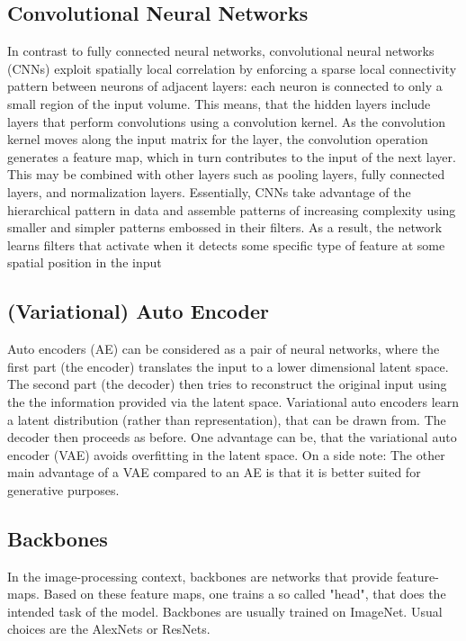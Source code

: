 \subsection{Convolutional Neural Networks}
In contrast to fully connected neural networks, convolutional neural networks (CNNs) exploit spatially local correlation by enforcing a sparse local connectivity pattern between neurons of adjacent layers: each neuron is connected to only a small region of the input volume.
This means, that the hidden layers include layers that perform convolutions using a convolution kernel. As the convolution kernel moves along the input matrix for the layer, the convolution operation generates a feature map, which in turn contributes to the input of the next layer. This may be combined with other layers such as pooling layers, fully connected layers, and normalization layers. Essentially, CNNs take advantage of the hierarchical pattern in data and assemble patterns of increasing complexity using smaller and simpler patterns embossed in their filters. As a result, the network learns filters that activate when it detects some specific type of feature at some spatial position in the input

\subsection{(Variational) Auto Encoder}
Auto encoders (AE) can be considered as a pair of neural networks, where the first part (the encoder) translates the input to a lower dimensional latent space. The second part (the decoder) then tries to reconstruct the original input using the the information provided via the latent space. Variational auto encoders learn a latent distribution (rather than representation), that can be drawn from. The decoder then proceeds as before. One advantage can be, that the variational auto encoder (VAE) avoids overfitting in the latent space. On a side note: The other main advantage of a VAE compared to an AE is that it is better suited for generative purposes.

\subsection{Backbones}
In the image-processing context, backbones are networks that provide feature-maps. Based on these feature maps, one trains a so called "head", that does the intended task of the model. Backbones are usually trained on ImageNet. Usual choices are the AlexNets or ResNets.

